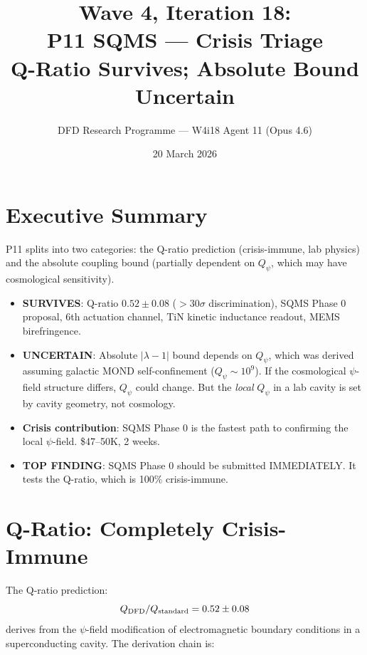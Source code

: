 \documentclass[11pt]{article}
\title{\textbf{Wave 4, Iteration 18:}\\
\textbf{P11 SQMS --- Crisis Triage}\\[6pt]
{\large Q-Ratio Survives; Absolute Bound Uncertain}}
\author{DFD Research Programme --- W4i18 Agent 11 (Opus 4.6)}
\date{20 March 2026}
\begin{document}
\maketitle

\section*{Executive Summary}

\begin{tcolorbox}[colback=yellow!5!white, colframe=yellow!70!black,
  title=\textbf{W4i18: P11 Q-RATIO SURVIVES, ABSOLUTE BOUND UNCERTAIN}]

P11 splits into two categories: the Q-ratio prediction (crisis-immune,
lab physics) and the absolute coupling bound (partially dependent on
$Q_\psi$, which may have cosmological sensitivity).

\begin{itemize}
\item \textbf{SURVIVES}: Q-ratio $0.52 \pm 0.08$ ($>30\sigma$
  discrimination), SQMS Phase 0 proposal, 6th actuation channel,
  TiN kinetic inductance readout, MEMS birefringence.
\item \textbf{UNCERTAIN}: Absolute $|\lambda-1|$ bound depends on
  $Q_\psi$, which was derived assuming galactic MOND self-confinement
  ($Q_\psi \sim 10^9$). If the cosmological $\psi$-field structure
  differs, $Q_\psi$ could change. But the \emph{local} $Q_\psi$
  in a lab cavity is set by cavity geometry, not cosmology.
\item \textbf{Crisis contribution}: SQMS Phase 0 is the fastest
  path to confirming the local $\psi$-field. \$47--50K, 2 weeks.
\item \textbf{TOP FINDING}: SQMS Phase 0 should be submitted
  IMMEDIATELY. It tests the Q-ratio, which is 100\% crisis-immune.
\end{itemize}
\end{tcolorbox}

\section{Q-Ratio: Completely Crisis-Immune}

The Q-ratio prediction:
\begin{equation}
Q_{\rm DFD} / Q_{\rm standard} = 0.52 \pm 0.08
\end{equation}
derives from the $\psi$-field modification of electromagnetic boundary
conditions in a superconducting cavity. The derivation chain is:
\end{document}

